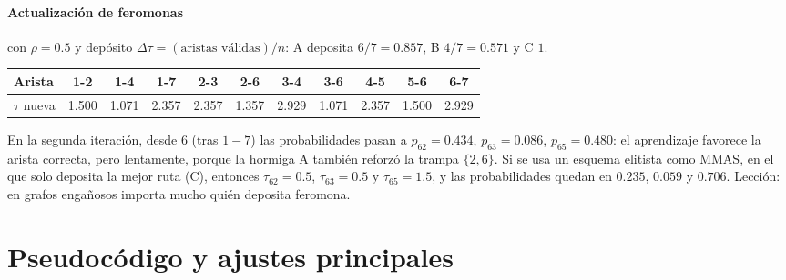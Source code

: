 \paragraph{Actualización de feromonas} con $\rho=0.5$ y depósito
$\Delta\tau=(\text{aristas válidas})/n$: A deposita $6/7=0.857$, B $4/7=0.571$ y C $1$.

\begin{center}
\begin{adjustbox}{max width=\linewidth}
\begin{tabular}{@{}lcccccccccc@{}}
\toprule
Arista & 1-2 & 1-4 & 1-7 & 2-3 & 2-6 & 3-4 & 3-6 & 4-5 & 5-6 & 6-7 \\
\midrule
$\tau$ nueva & 1.500 & 1.071 & 2.357 & 2.357 & 1.357 & 2.929 & 1.071 & 2.357 & 1.500 & 2.929 \\
\bottomrule
\end{tabular}
\end{adjustbox}
\end{center}

En la segunda iteración, desde 6 (tras $1\!-\!7$) las probabilidades pasan a
$p_{62}=0.434$, $p_{63}=0.086$, $p_{65}=0.480$: el aprendizaje favorece la arista correcta,
pero lentamente, porque la hormiga A también reforzó la trampa $\{2,6\}$. Si se usa un
esquema elitista como MMAS, en el que solo deposita la mejor ruta (C), entonces
$\tau_{62}=0.5$, $\tau_{63}=0.5$ y $\tau_{65}=1.5$, y las probabilidades quedan en
$0.235$, $0.059$ y $0.706$. Lección: en grafos engañosos importa mucho quién
deposita feromona.

\section{Pseudocódigo y ajustes principales}

